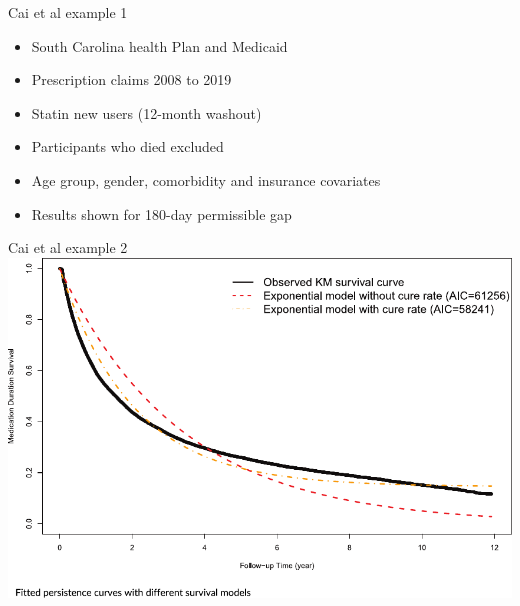 \documentclass[aspectratio=169,12pt]{beamer} %
\begin{document}
\begin{frame}{Cai et al example 1}
	\begin{itemize}
		\item South Carolina health Plan and Medicaid
		\item Prescription claims 2008 to 2019
		\item Statin new users (12-month washout)
		\item Participants who died excluded
		\item Age group, gender, comorbidity and insurance covariates
		\item Results shown for 180-day permissible gap
	\end{itemize}
\end{frame}

\begin{frame}{Cai et al example 2}
  \centering
  \includegraphics[height=0.7\textheight]{ref/cai_fig2.pdf}
\end{frame}
\end{document}
